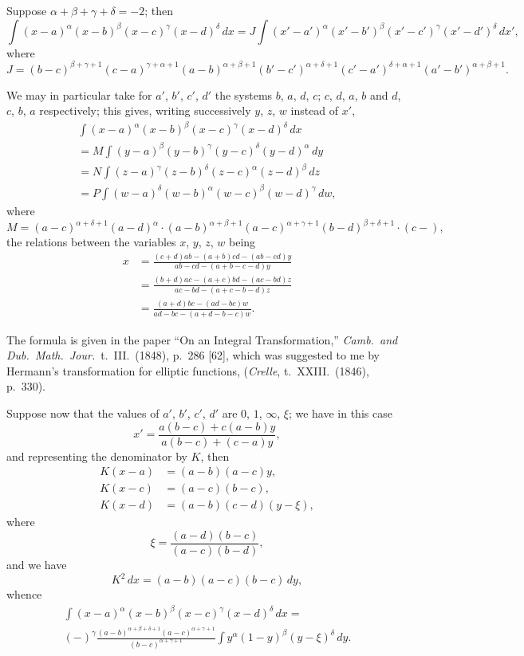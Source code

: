 \documentclass[12pt,a4paper]{article}
\theoremstyle{plain}
\begin{document}
Suppose $\alpha + \beta + \gamma + \delta = -2$; then
\[
\int (x-a)^\alpha (x-b)^\beta (x-c)^\gamma (x-d)^\delta \, dx
= J \int (x'-a')^\alpha (x'-b')^\beta (x'-c')^\gamma (x'-d')^\delta \, dx',
\]
where
\[
J = (b-c)^{\beta+\gamma+1} (c-a)^{\gamma+\alpha+1} (a-b)^{\alpha+\beta+1} (b'-c')^{\alpha+\delta+1} (c'-a')^{\delta+\alpha+1} (a'-b')^{\alpha+\beta+1}.
\]

We may in particular take for $a'$, $b'$, $c'$, $d'$ the systems $b$, $a$, $d$, $c$; $c$, $d$, $a$, $b$ and $d$, $c$, $b$, $a$ respectively; this gives, writing successively $y$, $z$, $w$ instead of $x'$,
\begin{multline*}
\int (x-a)^\alpha (x-b)^\beta (x-c)^\gamma (x-d)^\delta \, dx \\
= M \int (y-a)^\beta (y-b)^\gamma (y-c)^\delta (y-d)^\alpha \, dy \\
= N \int (z-a)^\gamma (z-b)^\delta (z-c)^\alpha (z-d)^\beta \, dz \\
= P \int (w-a)^\delta (w-b)^\alpha (w-c)^\beta (w-d)^\gamma \, dw,
\end{multline*}
where
\[
M = (a-c)^{\alpha+\delta+1} (a-d)^{\alpha} \cdot (a-b)^{\alpha+\beta+1} (a-c)^{\alpha+\gamma+1} (b-d)^{\beta+\delta+1} \cdot (c-),
\]
the relations between the variables $x$, $y$, $z$, $w$ being
\begin{align*}
x &= \frac{(c+d)ab - (a+b)cd - (ab-cd)y}{ab-cd - (a+b-c-d)y} \\
&= \frac{(b+d)ac - (a+c)bd - (ac-bd)z}{ac-bd - (a+c-b-d)z} \\
&= \frac{(a+d)bc - (ad-bc)w}{ad-bc - (a+d-b-c)w}.
\end{align*}

The formula is given in the paper ``On an Integral Transformation,'' \textit{Camb.\ and Dub.\ Math.\ Jour.}\ t.~III.\ (1848), p.~286 [62], which was suggested to me by Hermann's transformation for elliptic functions, (\textit{Crelle}, t.~XXIII.\ (1846), p.~330).

Suppose now that the values of $a'$, $b'$, $c'$, $d'$ are $0$, $1$, $\infty$, $\xi$; we have in this case
\[
x' = \frac{a(b-c) + c(a-b)y}{a(b-c) + (c-a)y},
\]
and representing the denominator by $K$, then
\begin{align*}
K(x-a) &= (a-b)(a-c)y, \\
K(x-c) &= (a-c)(b-c), \\
K(x-d) &= (a-b)(c-d)(y-\xi),
\end{align*}
where
\[
\xi = \frac{(a-d)(b-c)}{(a-c)(b-d)},
\]
and we have
\[
K^2 \, dx = (a-b)(a-c)(b-c) \, dy,
\]
whence
\begin{multline*}
\int (x-a)^\alpha (x-b)^\beta (x-c)^\gamma (x-d)^\delta \, dx = \\
(-)^{\gamma} \frac{(a-b)^{\alpha+\beta+\delta+1} (a-c)^{\alpha+\gamma+1}}{(b-c)^{\alpha+\gamma+1}}
\int y^\alpha (1-y)^\beta (y-\xi)^\delta \, dy.
\end{multline*}
\end{document}
